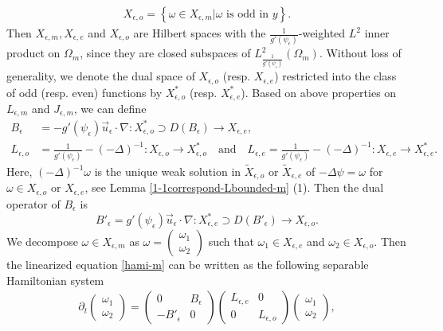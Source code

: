 \documentclass[1 [leqno, 11pt]{amsart}
\numberwithin{equation}{section}
\let\ep=\epsilon
\begin{document}
\begin{CJK*}{GBK}{song}
\begin{align*}
X_{\ep, o} = \left\{ \omega \in X_{\ep,m} | \omega \text{ is odd in }y \right\}.\end{align*}
Then $X_{\ep,m}, X_{\ep, e}$ and  $X_{\ep, o}$ are  Hilbert spaces with the $\frac{1}{g'(\psi_\ep)}$-weighted $L^2$ inner product on $\Omega_m$, since they are closed subspaces of $L_{\frac{1}{g'(\psi_\ep)}}^2(\Omega_m)$. Without loss of generality, we denote the dual space of  $X_{\ep, o}$ (resp. $X_{\ep, e}$) restricted into the class of odd (resp. even) functions by $X_{\ep, o}^*$ (resp. $X_{\ep, e}^*$).
Based on above properties on $L_{\epsilon,m}$ and  $J_{\epsilon,m}$, we can define
\begin{align*}B_\ep &= -g'(\psi_\ep) \vec{u}_\ep \cdot \nabla : X_{\ep, o}^* \supset D(B_\ep) \rightarrow X_{\ep, e}, \\
 L_{\ep,o} &= \frac{1}{g'(\psi_\ep)} - (-\Delta)^{-1}: X_{\ep, o} \rightarrow X_{\ep, o}^* \quad\text{and}\quad
 L_{\ep,e} = \frac{1}{g'(\psi_\ep)} - (-\Delta)^{-1}: X_{\ep, e} \rightarrow X_{\ep, e}^*.
 \end{align*}
Here, $(-\Delta)^{-1}\omega$ is the unique  weak solution in $\tilde X_{\ep,o}$ or $\tilde X_{\ep,e}$ of $-\Delta\psi=\omega$ for $\omega\in X_{\ep, o} \text{ or }X_{\ep, e}$, see Lemma \ref{1-1correspond-Lbounded-m} (1).
Then the dual operator of $B_\ep$ is
$$B'_\ep = g'(\psi_\ep) \vec{u}_\ep \cdot \nabla : X_{\ep, e}^* \supset D(B'_\ep) \rightarrow X_{\ep, o}.$$
We decompose $\omega \in X_{\ep,m}$ as $\omega = \left( \begin{array}{c} \omega_1 \\ \omega_2 \end{array} \right) $ such that $\omega_1 \in X_{\ep, e}$ and $\omega_2 \in X_{\ep, o}$. Then the linearized equation \eqref{hami-m} can be written as  the following separable Hamiltonian system
\begin{align}\label{sep-hamiltonian}
\partial_t \left( \begin{array}{c} \omega_1 \\ \omega_2 \end{array} \right) = \left( \begin{array}{cc} 0 & B_\ep \\ -B'_\ep & 0 \end{array} \right)\left( \begin{array}{cc} L_{\ep,e} & 0 \\ 0 & L_{\ep,o} \end{array} \right) \left( \begin{array}{c} \omega_1 \\ \omega_2 \end{array} \right),

\end{align}
\end{CJK*}
\end{document}
